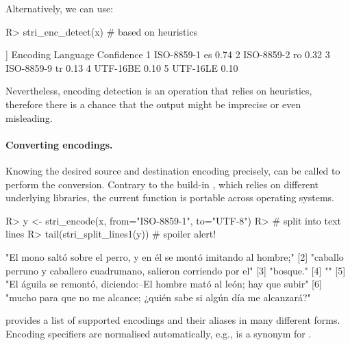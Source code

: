 \documentclass[nojss]{jss}
\begin{document}
\noindent
Alternatively, we can use:

\begin{Schunk}
\begin{Sinput}
R> stri_enc_detect(x)  # based on heuristics
\end{Sinput}
\begin{Soutput}
[[1]]
    Encoding Language Confidence
1 ISO-8859-1       es       0.74
2 ISO-8859-2       ro       0.32
3 ISO-8859-9       tr       0.13
4   UTF-16BE                0.10
5   UTF-16LE                0.10
\end{Soutput}
\end{Schunk}

\noindent
Nevertheless, encoding detection is an operation that relies on heuristics,
therefore there is a  chance that the output might be imprecise or even
misleading.




\paragraph{Converting encodings.}
Knowing the desired source and destination encoding precisely,
 can be called to perform the conversion.
Contrary to the build-in , which relies
on different underlying libraries, the current function is portable
across operating systems.


\begin{Schunk}
\begin{Sinput}
R> y <- stri_encode(x, from="ISO-8859-1", to="UTF-8")
R> # split into text lines
R> tail(stri_split_lines1(y))  # spoiler alert!
\end{Sinput}
\begin{Soutput}
[1] "El mono saltó sobre el perro, y en él se montó imitando al hombre;"
[2] "caballo perruno y caballero cuadrumano, salieron corriendo por el"
[3] "bosque."
[4] ""
[5] "El águila se remontó, diciendo:--El hombre mató al león; hay que subir"
[6] "mucho para que no me alcance; ¿quién sabe si algún día me alcanzará?"
\end{Soutput}
\end{Schunk}


  provides a list of
supported encodings and their aliases in many different forms.
Encoding specifiers are normalised automatically, e.g.,
 is a synonym for .

\end{document}
